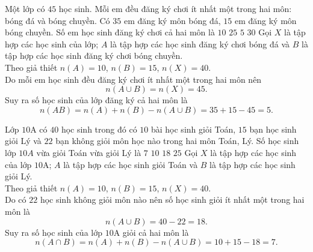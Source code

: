 \begin{ex}
Một lớp có $45$ học sinh. Mỗi em đều đăng ký chơi ít nhất một trong hai môn: bóng đá và bóng chuyền. Có $35$ em đăng ký môn bóng đá, $15$ em đăng ký môn bóng chuyền. Số em học sinh đăng ký chơi cả hai môn là
\choice
{$10$}
{$25$}
{\True $5$}
{$30$}
\loigiai
{
Gọi $X$ là tập hợp các học sinh của lớp; $A$ là tập hợp các học sinh đăng ký chơi bóng đá và $B$ là tập hợp các học sinh đăng ký chơi bóng chuyền.\\
Theo giả thiết $n(A)=10$, $n(B)=15$, $n(X)=40$. \\
Do mỗi em học sinh đều đăng ký chơi ít nhất một trong hai môn nên
$$n(A\cup B) = n(X) = 45.$$
Suy ra số học sinh của lớp đăng ký cả hai môn là
$$n(AB) = n(A) + n(B) - n(A\cup B) = 35+15-45 = 5.$$
}
\end{ex}

\begin{ex}
Lớp $10$A có $40$ học sinh trong đó có $10$ bài học sinh giỏi Toán, $15$ bạn học sinh giỏi Lý và $22$ bạn không giỏi môn học nào trong hai môn Toán, Lý. Số học sinh lớp $10A$ vừa giỏi Toán vừa giỏi Lý là
\choice
{\True $7$}
{$10$}
{$18$}
{$25$}
\loigiai
{
Gọi $X$ là tập hợp các học sinh của lớp $10$A; $A$ là tập hợp các học sinh giỏi Toán và $B$ là tập hợp các học sinh giỏi Lý.\\
Theo giả thiết $n(A)=10$, $n(B)=15$, $n(X)=40$.\\
Do có $22$ học sinh không giỏi môn nào nên số học sinh giỏi ít nhất một trong hai môn là
$$n(A\cup B) = 40 - 22 = 18.$$
Suy ra số học sinh của lớp $10$A giỏi cả hai môn là
$$n(A\cap B) = n(A) + n(B) - n(A\cup B) = 10+15-18 = 7.$$
}
\end{ex}

